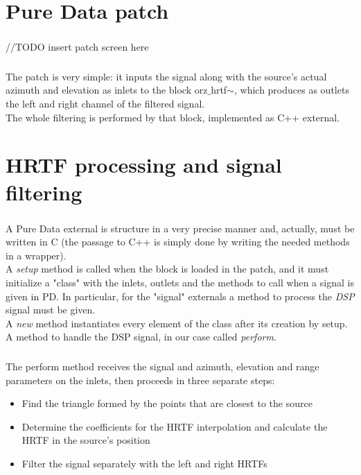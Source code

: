 \documentclass{beamer}
\begin{document}
	\section{Pure Data patch}

	\begin{frame}
		\frametitle{\insertsection}
		//TODO insert patch screen here
	\end{frame}

	\begin{frame}
		\frametitle{\insertsection}
		The patch is very simple: it inputs the signal along with the source's actual
		azimuth and elevation as inlets to the block orz$\_$hrtf$\sim$, which produces
		as outlets the left and right channel of the filtered signal.\\
		The whole filtering is performed by that block, implemented as C++ external.\\
	\end{frame}

	\section{HRTF processing and signal filtering}

	\begin{frame}
		\frametitle{\insertsection}
		A Pure Data external is structure in a very precise manner and, actually, must be
		written in C (the passage to C++ is simply done by writing the needed methods in a wrapper).\\
		A {\em setup} method is called when the block is loaded in the patch, and it must initialize
		a "class" with the inlets, outlets and the methods to call when a signal is given in PD.
		In particular, for the "signal" externals a method to process the {\em DSP} signal must be given.\\
		A {\em new} method instantiates every element of the class after its creation by setup.\\
		A method to handle the DSP signal, in our case called {\em perform}.\\
	\end{frame}

	\begin{frame}
		\frametitle{\insertsection}
		The perform method receives the signal and azimuth, elevation and range parameters on the inlets,
		then proceeds in three separate steps:
		\begin{itemize}
			\item Find the triangle formed by the points that are closest to the source
			\item Determine the coefficients for the HRTF interpolation and calculate the HRTF in the source's
				position
			\item Filter the signal separately with the left and right HRTFs
		\end{itemize}
	\end{frame}
\end{document}

